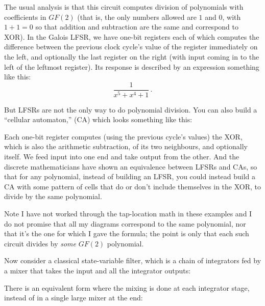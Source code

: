 {\centering\par}

The usual analysis is that this circuit computes division of polynomials with
coefficients in $GF(2)$ (that is, the only numbers allowed are $1$ and $0$,
with $1+1=0$ so that addition and subtraction are the same and correspond to
XOR).
In the Galois LFSR, we have one-bit registers each of which computes the
difference between the previous clock cycle's value of the register
immediately on the left, and optionally the last register on the right (with
input coming in to the left of the leftmost register).
Its response is described by an expression something like this:
\begin{equation*}
\frac{1}{x^5+x^4+1}\, .
\end{equation*}

But LFSRs are not the only way to do polynomial division.  You can also
build a ``cellular automaton,'' (CA) which looks something like this:

{\centering\par}

Each one-bit register computes (using the previous cycle's values) the XOR,
which is also the arithmetic subtraction, of its two neighbours, and
optionally itself.  We feed input into one end and take output from the
other.  And the discrete mathematicians have shown an equivalence between
LFSRs and CAs, so that for any polynomial, instead of building an LFSR, you
could instead build a CA with some pattern of cells that do or don't include
themselves in the XOR, to divide by the same polynomial.

Note I have not worked through the tap-location math in these
examples and I do not promise that all my diagrams correspond to the same
polynomial, nor that it's the one for which I gave the formula; the point is
only that each such circuit divides by \emph{some} $GF(2)$ polynomial.

Now consider a classical state-variable filter, which is a chain of
integrators fed by a mixer that takes the input and all the integrator
outputs:

{\centering\par}

There is an equivalent form where the mixing is done at each integrator
stage, instead of in a single large mixer at the end:

{\centering\par}

